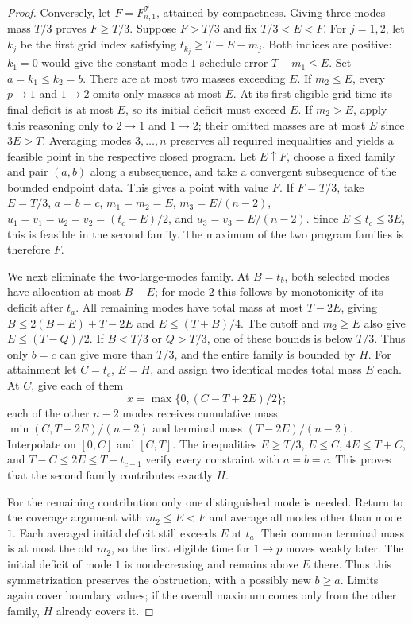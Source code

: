 \begin{proof}
Conversely, let $F=F^{\mathcal T}_{n,1}$, attained by compactness.
Giving three modes mass $T/3$ proves $F\ge T/3$. Suppose $F>T/3$ and
fix $T/3<E<F$. For $j=1,2$, let $k_j$ be the first grid index satisfying
$t_{k_j}\ge T-E-m_j$. Both indices are positive: $k_1=0$ would give
the constant mode-$1$ schedule error $T-m_1\le E$. Set $a=k_1\le k_2=b$.
There are at most two masses exceeding $E$.
If $m_2\le E$, every $p\to1$ and $1\to2$ omits only masses at most
$E$. At its first eligible grid time its final deficit is at most $E$,
so its initial deficit must exceed $E$.
If $m_2>E$, apply this reasoning only to $2\to1$ and $1\to2$; their
omitted masses are at most $E$ since $3E>T$.
Averaging modes $3,\ldots,n$ preserves all required inequalities and yields
a feasible point in the respective closed program. Let $E\uparrow F$,
choose a fixed family and pair $(a,b)$ along a subsequence, and take a
convergent subsequence of the bounded endpoint data. This gives a point
with value $F$.
If $F=T/3$, take $E=T/3$, $a=b=c$, $m_1=m_2=E$,
$m_3=E/(n-2)$, $u_1=v_1=u_2=v_2=(t_c-E)/2$, and
$u_3=v_3=E/(n-2)$. Since $E\le t_c\le3E$, this is feasible in the
second family. The maximum of the two program families is therefore $F$.

We next eliminate the two-large-modes family. At $B=t_b$, both selected
modes have allocation at most $B-E$; for mode $2$ this follows by
monotonicity of its deficit after $t_a$. All remaining modes have total
mass at most $T-2E$, giving $B\le2(B-E)+T-2E$ and
$E\le(T+B)/4$. The cutoff and $m_2\ge E$ also give
$E\le(T-Q)/2$. If $B<T/3$ or $Q>T/3$, one of these bounds is below
$T/3$. Thus only $b=c$ can give more than $T/3$, and the entire family
is bounded by $H$.
For attainment let $C=t_c$, $E=H$, and assign two identical modes total
mass $E$ each. At $C$, give each of them
\begin{equation}\label{eq:grid-H-witness}
 x=\max\{0,(C-T+2E)/2\};
\end{equation}
each of the other $n-2$ modes receives cumulative mass
$\min(C,T-2E)/(n-2)$ and terminal mass $(T-2E)/(n-2)$.
Interpolate on $[0,C]$ and $[C,T]$.
The inequalities $E\ge T/3$, $E\le C$, $4E\le T+C$, and
$T-C\le2E\le T-t_{c-1}$ verify every constraint with $a=b=c$.
This proves that the second family contributes exactly $H$.

For the remaining contribution only one distinguished mode is needed.
Return to the coverage argument with $m_2\le E<F$ and average all
modes other than mode $1$. Each averaged initial deficit still exceeds
$E$ at $t_a$. Their common terminal mass is at most the old $m_2$, so
the first eligible time for $1\to p$ moves weakly later. The initial
deficit of mode $1$ is nondecreasing and remains above $E$ there.
Thus this symmetrization preserves the obstruction, with a possibly new
$b\ge a$. Limits again cover boundary values; if the overall maximum
comes only from the other family, $H$ already covers it.


\end{proof}
